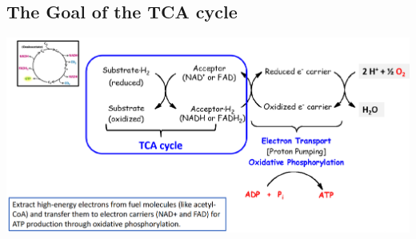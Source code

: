 \documentclass[10pt]{article}
\begin{document}
\subsection*{The Goal of the TCA cycle}
\begin{center} 
	\includegraphics*[width=\textwidth]{L2_20.png}
\end{center}
\end{document}
